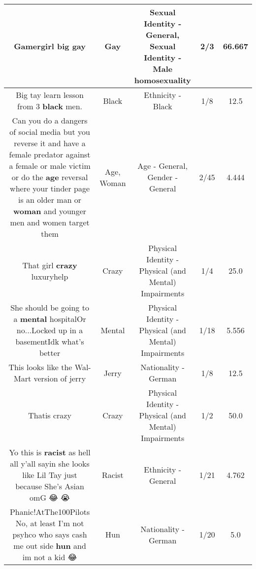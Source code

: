 \documentclass[11pt]{article}
\newlength\mylength
\begin{document}
\begin{center}
\begin{longtable}{|C{.65\mylength}|C{.30\mylength}|C{.12\mylength}|C{.12\mylength}|C{.12\mylength}|}
  \small Gamergirl big gay\normalsize   & Gay & Sexual Identity - General, Sexual Identity - Male homosexuality & 2/3 & 66.667 \\  \hline
  \small Big tay learn lesson from 3 \textbf{black} men.\normalsize   & Black & Ethnicity - Black & 1/8 & 12.5 \\  \hline
  \small Can you do a dangers of social media but you reverse it and have a female predator against a female or male victim or do the \textbf{age} reversal where your tinder page is an older man or \textbf{woman} and younger men and women target them\normalsize   & Age, Woman & Age - General, Gender - General & 2/45 & 4.444 \\  \hline
  \small That girl \textbf{crazy} luxuryhelp\normalsize   & Crazy & Physical Identity - Physical (and Mental) Impairments & 1/4 & 25.0 \\  \hline
  \small She should be going to a \textbf{mental} hospitalOr no...Locked up in a basementIdk what's better\normalsize   & Mental & Physical Identity - Physical (and Mental) Impairments & 1/18 & 5.556 \\  \hline
  \small This looks like the Wal-Mart version of jerry\normalsize   & Jerry & Nationality - German & 1/8 & 12.5 \\  \hline
  \small Thatis crazy\normalsize   & Crazy & Physical Identity - Physical (and Mental) Impairments & 1/2 & 50.0 \\  \hline
  \small Yo this is \textbf{racist} as hell all y'all sayin she looks like Lil Tay just because She's Asian omG 😂 😭\normalsize   & Racist & Ethnicity - General & 1/21 & 4.762 \\  \hline
  \small Phanic!AtThe100Pilots No, at least I'm not psyhco who says cash me out side \textbf{hun} and im not a kid 😂\normalsize   & Hun & Nationality - German & 1/20 & 5.0 \\  \hline

\end{longtable}
\end{center}
\end{document}
